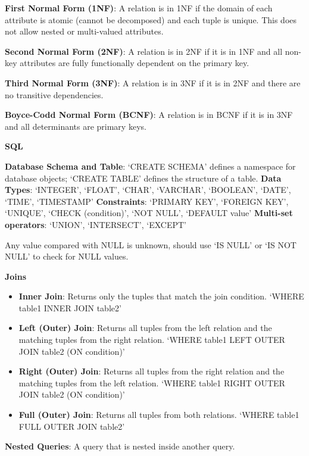 \documentclass{article}
\begin{document}
\noindent \textbf{First Normal Form (1NF)}: A relation is in 1NF if the domain of each attribute is atomic 
(cannot be decomposed) and each tuple is unique. This does not allow nested or multi-valued attributes.

\noindent \textbf{Second Normal Form (2NF)}: A relation is in 2NF if it is in 1NF and all non-key attributes are 
fully functionally dependent on the primary key.

\noindent \textbf{Third Normal Form (3NF)}: A relation is in 3NF if it is in 2NF and there are no transitive dependencies.

\noindent \textbf{Boyce-Codd Normal Form (BCNF)}: A relation is in BCNF if it is in 3NF and all determinants are primary keys.

\noindent \textbf{SQL}

\noindent \textbf{Database Schema and Table}: `CREATE SCHEMA' defines a namespace for database objects; `CREATE TABLE' defines the structure of a table.
\noindent \textbf{Data Types}: `INTEGER', `FLOAT', `CHAR', `VARCHAR', `BOOLEAN', `DATE', `TIME', `TIMESTAMP'
\noindent \textbf{Constraints}: `PRIMARY KEY', `FOREIGN KEY', `UNIQUE', `CHECK (condition)', `NOT NULL', `DEFAULT {value}'
\noindent \textbf{Multi-set operators}: `UNION', `INTERSECT', `EXCEPT'

\noindent Any value compared with NULL is unknown, should use `IS NULL' or `IS NOT NULL' to check for NULL values.

\noindent \textbf{Joins}

\begin{itemize}
    \item \textbf{Inner Join}: Returns only the tuples that match the join condition. `WHERE table1 INNER JOIN table2'
    \item \textbf{Left (Outer) Join}: Returns all tuples from the left relation and the matching tuples from the right relation. `WHERE table1 LEFT OUTER JOIN table2 (ON condition)' 
    \item \textbf{Right (Outer) Join}: Returns all tuples from the right relation and the matching tuples from the left relation. `WHERE table1 RIGHT OUTER JOIN table2 (ON condition)'
    \item \textbf{Full (Outer) Join}: Returns all tuples from both relations. `WHERE table1 FULL OUTER JOIN table2'
\end{itemize}

\noindent \textbf{Nested Queries}: A query that is nested inside another query.
\end{document}
